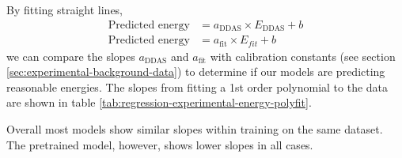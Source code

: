 \noindent By fitting straight lines,
\begin{align}
    \text{Predicted energy} &= a_{\text{DDAS}}\times E_{\text{DDAS}} + b\\
    \text{Predicted energy} &= a_{\text{fit}}\times E_{{fit}} + b
\end{align}
we can compare the slopes $a_{\text{DDAS}}$ and $a_{\text{fit}}$ with calibration constants (see section \ref{sec:experimental-background-data}) 
to determine if our models are predicting reasonable energies. The slopes from fitting a 1st order 
polynomial to the data are shown in table \ref{tab:regression-experimental-energy-polyfit}.

Overall most models show similar slopes within training on the same dataset. The pretrained model,
however, shows lower slopes in all cases.


